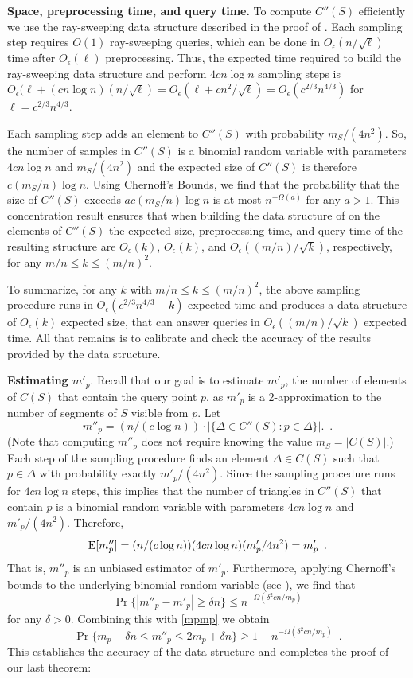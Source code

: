 \documentclass{patmorin}
\newcommand{\Oe}{O_\epsilon}
\begin{document}
\noindent\textbf{Space, preprocessing time, and query time.}
To compute $C''(S)$ efficiently we use the ray-sweeping data structure
described in the proof of .  Each sampling
step requires $O(1)$ ray-sweeping queries, which can be done in
$\Oe(n/\sqrt{\ell})$ time after $\Oe(\ell)$ preprocessing.  Thus, the
expected time required to build the ray-sweeping data structure and
perform $4cn\log n$ sampling steps is
$
    \Oe(\ell + (cn\log n)(n/\sqrt{\ell})
       = \Oe(\ell + cn^2/\sqrt{\ell})
       = \Oe(c^{2/3}n^{4/3})
$
for $\ell=c^{2/3}n^{4/3}$.

Each sampling step adds an element to $C''(S)$ with probability $m_S/(4n^2)$.
So, the number of samples in $C''(S)$ is a binomial random
variable with parameters $4cn\log n$ and $m_S/(4n^2)$ and the expected
size of $C''(S)$ is therefore $c(m_S/n)\log n$. Using Chernoff's
Bounds, we find that the probability that the size of $C''(S)$
exceeds $ac(m_S/n)\log n$ is at most $n^{-\Omega(a)}$ for any $a>1$.
This concentration result ensures that when building the data structure
of  on the elements of $C''(S)$ the expected
size, preprocessing time, and query time of the resulting structure are
$\Oe(k)$, $\Oe(k)$, and $\Oe((m/n)/\sqrt{k})$, respectively, for any
$m/n\le k\le (m/n)^2$.

To summarize, for any $k$ with $m/n \le k \le (m/n)^2$, the above
sampling procedure runs in $\Oe(c^{2/3}n^{4/3} + k)$ expected time and
produces a data structure of $\Oe(k)$ expected size, that can answer
queries in $\Oe((m/n)/\sqrt{k})$ expected time.  All that remains is to
calibrate and check the accuracy of the results provided by the data
structure. \smallbreak

\noindent\textbf{Estimating $m'_p$}.
Recall that our goal is to estimate $m'_p$, the number of elements of $C(S)$
that contain the query point $p$, as $m'_p$ is a 2-approximation to the
number of segments of $S$ visible from $p$.  Let
\[
    m''_p = (n/(c\log n))\cdot |\{ \Delta\in C''(S) : p\in \Delta\}|. \enspace .
\]
(Note that computing $m''_p$ does not require knowing the value
$m_S=|C(S)|$.)  Each step of the sampling procedure finds an element
$\Delta\in C(S)$ such that $p\in\Delta$ with probability exactly $m'_p
/ (4n^2)$.  Since the sampling procedure runs for $4cn\log n$ steps, this
implies that the number of triangles in $C''(S)$ that contain $p$ is a
binomial random variable with parameters $4cn\log n$ and $m'_p/(4n^2)$.
Therefore,
\[
    \mathrm{E}[m''_p] = (n/(c\log n))(4cn\log n)(m'_p/4n^2) = m'_p \enspace .
\]
That is, $m''_p$ is an unbiased estimator of $m'_p$.  Furthermore, applying
Chernoff's bounds to the underlying binomial random variable (see
),
we find that
\[
  \Pr\{|m''_p - m'_p| \ge \delta n\} \le n^{-\Omega(\delta^2cn/m_p)}
\]
for any $\delta > 0$.  Combining this with \eqref{mpmp} we obtain
\[
   \Pr\{m_p-\delta n \le m''_p \le 2m_p+\delta n\}
     \ge 1-n^{-\Omega(\delta^2 cn/m_p)}  \enspace .
\]
This establishes the accuracy of the data structure and completes the proof
of our last theorem:
\end{document}
